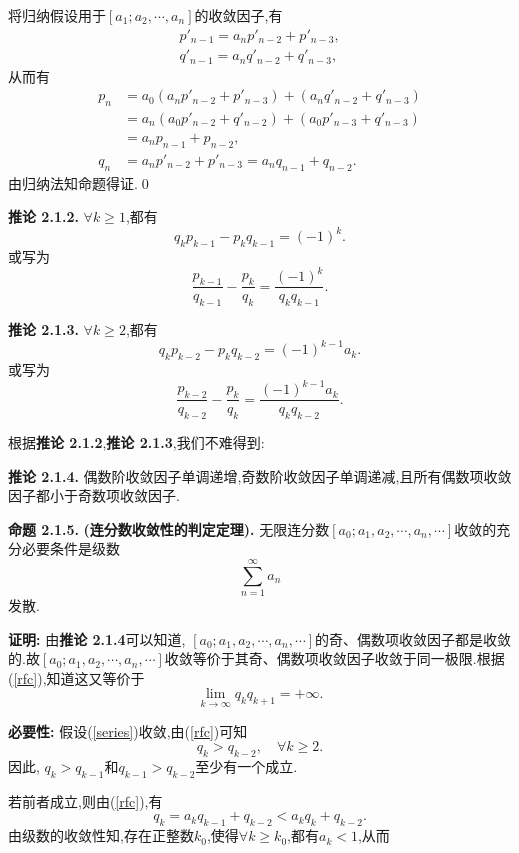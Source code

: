 \par
将归纳假设用于$[a_1;a_2,\cdots,a_n]$的收敛因子,有
    \begin{align*}
    p'_{n-1}=a_np'_{n-2}+p'_{n-3},\\
    q'_{n-1}=a_nq'_{n-2}+q'_{n-3},
    \end{align*}
从而有
    \begin{align*}
    p_n&=a_0(a_np'_{n-2}+p'_{n-3})+(a_nq'_{n-2}+q'_{n-3}) \\
    &=a_n(a_0p'_{n-2}+q'_{n-2})+(a_0p'_{n-3}+q'_{n-3}) \\
    &=a_np_{n-1}+p_{n-2},\\
    q_n&=a_np'_{n-2}+p'_{n-3}=a_nq_{n-1}+q_{n-2}.
    \end{align*}
由归纳法知命题得证.\qed
\par
\textbf{推论 2.1.2.  }\textsuperscript{\cite{Khinchin}}
$\forall k\geqslant 1$,都有
$$q_kp_{k-1}-p_kq_{k-1}=(-1)^k.$$
或写为
$$\frac{p_{k-1}}{q_{k-1}}-\frac{p_k}{q_k}=\frac{(-1)^k}{q_kq_{k-1}}.$$
\par
\textbf{推论 2.1.3.  }\textsuperscript{\cite{Khinchin}}
$\forall k\geqslant2$,都有
$$q_kp_{k-2}-p_kq_{k-2}={(-1)}^{k-1}a_k.$$
或写为
$$\frac{p_{k-2}}{q_{k-2}}-\frac{p_k}{q_k}=\frac{(-1)^{k-1}a_k}{q_kq_{k-2}}.$$
\par
根据\textbf{推论  2.1.2},\textbf{推论  2.1.3},我们不难得到:\par
\textbf{推论 2.1.4.  }\textsuperscript{\cite{Khinchin}}
偶数阶收敛因子单调递增,奇数阶收敛因子单调递减,且所有偶数项收敛因子都小于奇数项收敛因子.
\par
\textbf{命题 2.1.5.  }\textsuperscript{\cite{Khinchin}}\textbf{(连分数收敛性的判定定理).  }
无限连分数$[a_0;a_1,a_2,\cdots,a_n,\cdots]$收敛的充分必要条件是级数
\begin{equation}\label{series}
\sum_{n=1}^{\infty}a_n
\end{equation}
发散.
\par
\textbf{证明:  }
由\textbf{推论 2.1.4}可以知道, $[a_0;a_1,a_2,\cdots,a_n,\cdots]$的奇、偶数项收敛因子都是收敛的.故$[a_0;a_1,a_2,\cdots,a_n,\cdots]$收敛等价于其奇、偶数项收敛因子收敛于同一极限.根据(\ref{rfc}),知道这又等价于
$$\lim_{k\to\infty}{q_kq_{k+1}}=+\infty.$$\par
\textbf{必要性: }假设(\ref{series})收敛,由(\ref{rfc})可知
$$q_k>q_{k-2},\quad \forall k\geqslant 2.$$
因此, $q_k>q_{k-1}$和$q_{k-1}>q_{k-2}$至少有一个成立.\par
若前者成立,则由(\ref{rfc}),有
$$q_k=a_kq_{k-1}+q_{k-2}<a_kq_k+q_{k-2}.$$
由级数的收敛性知,存在正整数$k_0$,使得$\forall k\geqslant k_0$,都有$a_k<1$,从而
